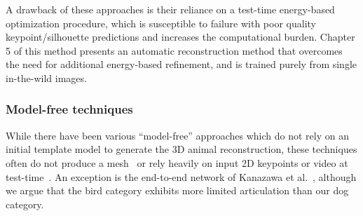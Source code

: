     A drawback of these approaches is their reliance on a test-time energy-based optimization procedure, which is susceptible to failure with poor quality keypoint/silhouette predictions and increases the computational burden. Chapter 5 of this method presents an automatic reconstruction method that overcomes the need for additional energy-based refinement, and is trained purely from single in-the-wild images.

    \subsubsection{Model-free techniques}

    While there have been various ``model-free'' approaches which do not rely on an initial template model to generate the 3D animal reconstruction, these techniques often do not produce a mesh~\cite{Agudo_2018_CVPR,novotny19c3dpo} or rely heavily on input 2D keypoints or video at test-time~\cite{vicente_3dv,Probst2018_ECCVa}. An exception is the end-to-end network of Kanazawa et al.~\cite{kanazawa2018birds}, although we argue that the bird category exhibits more limited articulation than our dog category.






